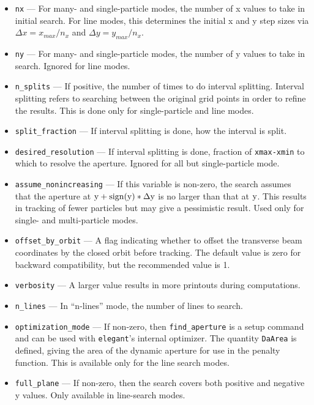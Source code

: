 \documentclass[11pt]{article}
\begin{document}
\begin{itemize}
\item \verb|nx| --- For many- and single-particle modes, the number of x values to take in initial search.
  For line modes, this determines the initial x and y step sizes via $\Delta x = x_{max}/n_x$ and
  $\Delta y = y_{max}/n_x$.
\item \verb|ny| --- For many- and single-particle modes, the number of y values to take in search.
  Ignored for line modes.

\item \verb|n_splits| --- If positive, the number of times to do
interval splitting.  Interval splitting refers to searching between
the original grid points in order to refine the results.  This is done
only for single-particle and line modes.

\item \verb|split_fraction| --- If interval splitting is done, how the interval is split.

\item \verb|desired_resolution| --- If interval splitting is done,
fraction of \verb|xmax-xmin| to which to resolve the aperture.  Ignored for all but single-particle
mode.

\item \verb|assume_nonincreasing| --- If this variable is non-zero, the search assumes that the aperture
at ${\rm y+sign(y)*\Delta y}$ is no larger than that at ${\rm y}$.  This results in tracking of
fewer particles but may give a pessimistic result.    Used only for single- and multi-particle
modes.

\item \verb|offset_by_orbit| --- A flag indicating whether to offset
the transverse beam coordinates by the closed orbit before tracking.  The default value is
zero for backward compatibility, but the recommended value is 1.

\item \verb|verbosity| --- A larger value results in more printouts during computations.

\item \verb|n_lines| --- In ``n-lines'' mode, the number of lines to search.

\item \verb|optimization_mode| --- If non-zero, then \verb|find_aperture| is a setup command and can be used
with {\tt elegant}'s internal optimizer.  The quantity \verb|DaArea| is defined, giving the area of the dynamic
aperture for use in the penalty function.  This is available only for the line search modes.

\item \verb|full_plane| --- If non-zero, then the search covers both positive and negative y values.
  Only available in line-search modes.

\end{itemize}
\end{document}
